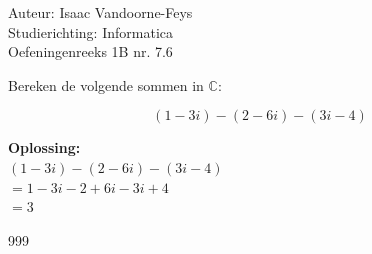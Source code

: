 \documentclass[a4paper]{article}
\begin{document}
  
\noindent \large Auteur: Isaac Vandoorne-Feys \\
\noindent \large Studierichting: Informatica\\
\noindent \large Oefeningenreeks 1B nr. 7.6\\

\medskip

\normalsize
	Bereken de volgende sommen in $\mathbb{C}$:

	\begin{equation*}
		(1-3i)-(2-6i)-(3i-4)
	\end{equation*}
	
	
	\noindent \textbf{Oplossing:}\\
	
	$(1-3i)-(2-6i)-(3i-4)$ \\	
	
	$= 1- 3i - 2 + 6i - 3i + 4$ \\
	
	$= 3$ \\
\begin{thebibliography}{999}
\end{thebibliography}
\end{document}
